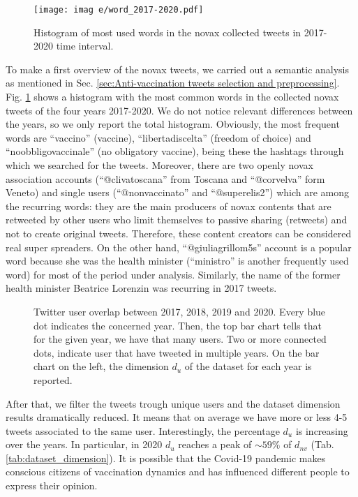 \documentclass[prb,twocolumn,9pt]{revtex4-1}
\begin{document}
\begin{figure}[t]
   \begin{minipage}[l]{1.0\columnwidth}
   \centering
   \texttt{[image: imag
   e/word\_2017-2020.pdf]}
   \caption{Histogram of most used words in the novax collected tweets in 2017-2020 time interval.}
   \label{fig:count_word}
   \end{minipage}
\end{figure}

To make a first overview of the novax tweets, we carried out a semantic analysis as mentioned in Sec. \ref{sec:Anti-vaccination tweets selection and preprocessing}. Fig. \ref{fig:count_word} shows a histogram with the most common words in the collected novax tweets of the four years 2017-2020. We do not notice relevant differences between the years, so we only report the total histogram. Obviously, the most frequent words are “vaccino” (vaccine), “libertadiscelta” (freedom of choice) and “noobbligovaccinale” (no obligatory vaccine), being these the hashtags through which we searched for the tweets.
Moreover, there are two openly novax association accounts (“@clivatoscana” from Toscana and “@corvelva” form Veneto) and single users (“@nonvaccinato” and “@superelis2”) which are among the recurring words: they are the main producers of novax contents that are retweeted by other users who limit themselves to passive sharing (retweets) and not to create original tweets. Therefore, these content creators can be considered real super spreaders. On the other hand, “@giuliagrillom5s” account is a popular word because she was the health minister (“ministro” is another frequently used word) for most of the period under analysis. Similarly, the name of the former health minister Beatrice Lorenzin was recurring in 2017 tweets.

\begin{figure}[t]
   \begin{minipage}[l]{1.0\columnwidth}
   \centering

   \caption{Twitter user overlap between 2017, 2018, 2019 and 2020. Every blue dot indicates the concerned year. Then, the top bar chart tells that for the given year, we have that many users. Two or more connected dots, indicate user that have tweeted in multiple years. On the bar chart on the left, the dimension $d_u$ of the dataset for each year is reported.
   }
   \label{fig:overlap}
   \end{minipage}
\end{figure}

After that, we filter the tweets trough unique users and the dataset dimension results dramatically reduced. It means that on average we have more or less 4-5 tweets associated to the same user. Interestingly, the percentage $d_u$ is increasing over the years. In particular, in 2020 $d_u$ reaches a peak of $\sim 59 \%$ of $d_{nv}$ (Tab. \ref{tab:dataset_dimension}). It is possible that the Covid-19 pandemic makes conscious citizens of vaccination dynamics and has influenced different people to express their opinion. 
\end{document}
